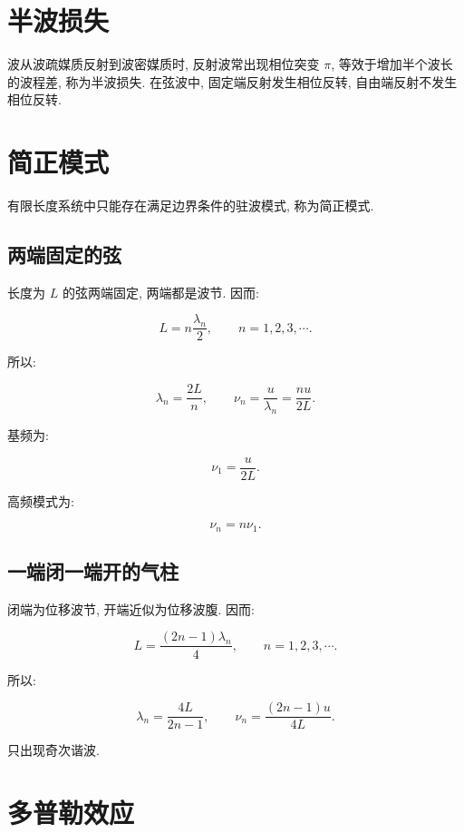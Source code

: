 \documentclass[
  a4paper,
]{ctexrep}
\begin{document}
\section{半波损失}\label{ux534aux6ce2ux635fux5931}

波从波疏媒质反射到波密媒质时, 反射波常出现相位突变 \(\pi\),
等效于增加半个波长的波程差, 称为半波损失. 在弦波中,
固定端反射发生相位反转, 自由端反射不发生相位反转.

\section{简正模式}\label{ux7b80ux6b63ux6a21ux5f0f}

有限长度系统中只能存在满足边界条件的驻波模式, 称为简正模式.

\subsection{两端固定的弦}\label{ux4e24ux7aefux56faux5b9aux7684ux5f26}

长度为 \(L\) 的弦两端固定, 两端都是波节. 因而:

\[
L=n\frac{\lambda_n}{2},\qquad n=1,2,3,\cdots.
\]

所以:

\[
\lambda_n=\frac{2L}{n},
\qquad
\nu_n=\frac{u}{\lambda_n}=\frac{nu}{2L}.
\]

基频为:

\[
\nu_1=\frac{u}{2L}.
\]

高频模式为:

\[
\nu_n=n\nu_1.
\]

\subsection{一端闭一端开的气柱}\label{ux4e00ux7aefux95edux4e00ux7aefux5f00ux7684ux6c14ux67f1}

闭端为位移波节, 开端近似为位移波腹. 因而:

\[
L=\frac{(2n-1)\lambda_n}{4},\qquad n=1,2,3,\cdots.
\]

所以:

\[
\lambda_n=\frac{4L}{2n-1},
\qquad
\nu_n=\frac{(2n-1)u}{4L}.
\]

只出现奇次谐波.

\section{多普勒效应}\label{ux591aux666eux52d2ux6548ux5e94}
\end{document}
